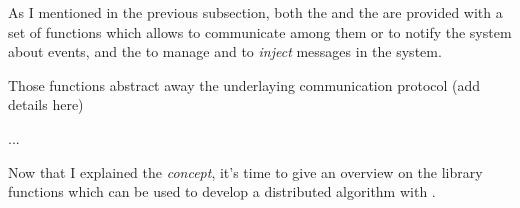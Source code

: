 As I mentioned in the previous subsection, both the  and the  are provided with a set of
functions which allows  to communicate among them
or to notify the system about events, and the  to manage
 and to \emph{inject} messages in the system.

Those functions abstract away the underlaying communication protocol (add
details here)

...

Now that I explained the \emph{concept}, it's time to give an overview on
the library functions which can be used to develop a distributed algorithm
with \YUNA.



